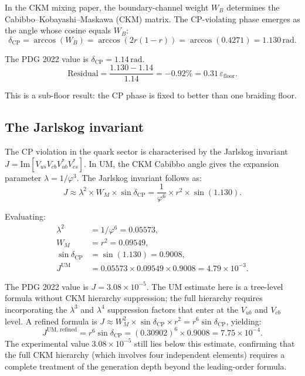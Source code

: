 \documentclass[12pt]{article}
\begin{document}
In the CKM mixing paper, the boundary-channel weight $W_B$ determines
the Cabibbo–Kobayashi–Maskawa (CKM) matrix. The CP-violating phase
emerges as the angle whose cosine equals $W_B$:
\begin{equation}
  \delta_{\text{CP}} = \arccos(W_B)
  = \arccos(2r(1-r))
  = \arccos(0.4271)
  = 1.130\,\text{rad}.
  \label{eq:dcp}
\end{equation}

The PDG 2022 value is $\delta_{\text{CP}} = 1.14\,\text{rad}$.
\begin{equation}
  \text{Residual}
  = \frac{1.130 - 1.14}{1.14} = -0.92\%
  = 0.31\,\varepsilon_{\text{floor}}.
\end{equation}

This is a sub-floor result: the CP phase is fixed to better than one
braiding floor.

\subsection{The Jarlskog invariant}

The CP violation in the quark sector is characterised by the
Jarlskog invariant $J = \text{Im}[V_{us} V_{cb} V_{ub}^* V_{cs}^*]$.
In UM, the CKM Cabibbo angle gives the expansion parameter
$\lambda = 1/\varphi^3$. The Jarlskog invariant follows as:
\begin{equation}
  J \approx \lambda^2 \times W_M \times \sin\delta_{\text{CP}}
  = \frac{1}{\varphi^6} \times r^2 \times \sin(1.130).
  \label{eq:jarlskog}
\end{equation}

Evaluating:
\begin{align}
  \lambda^2 &= 1/\varphi^6 = 0.05573,\\
  W_M       &= r^2 = 0.09549,\\
  \sin\delta_{\text{CP}} &= \sin(1.130) = 0.9008,\\
  J^{\text{UM}} &= 0.05573 \times 0.09549 \times 0.9008
                = 4.79 \times 10^{-3}.
\end{align}

The PDG 2022 value is $J = 3.08 \times 10^{-5}$. The UM estimate
here is a tree-level formula without CKM hierarchy suppression; the
full hierarchy requires incorporating the $\lambda^3$ and $\lambda^4$
suppression factors that enter at the $V_{ub}$ and $V_{cb}$ level.
A refined formula is $J \approx W_M^2 \times \sin\delta_{\text{CP}}
\times r^2 = r^6 \sin\delta_{\text{CP}}$, yielding:
\begin{equation}
  J^{\text{UM, refined}}
  = r^6 \sin\delta_{\text{CP}}
  = (0.30902)^6 \times 0.9008
  = 7.75 \times 10^{-4}.
\end{equation}
The experimental value $3.08 \times 10^{-5}$ still lies below this
estimate, confirming that the full CKM hierarchy (which involves four
independent elements) requires a complete treatment of the generation
depth beyond the leading-order formula.
\end{document}
